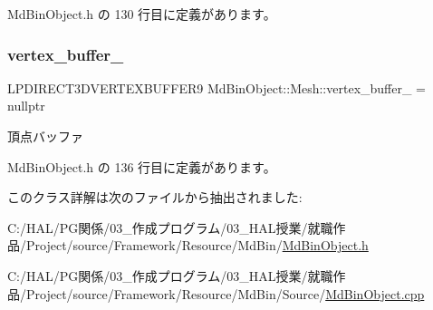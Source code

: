  Md\+Bin\+Object.\+h の 130 行目に定義があります。

\mbox{\label{class_md_bin_object_1_1_mesh_a184d71ac41aa259b9af29386f3349380}} 
\subsubsection{\texorpdfstring{vertex\+\_\+buffer\+\_\+}{vertex\_buffer\_}}
{\footnotesize\ttfamily L\+P\+D\+I\+R\+E\+C\+T3\+D\+V\+E\+R\+T\+E\+X\+B\+U\+F\+F\+E\+R9 Md\+Bin\+Object\+::\+Mesh\+::vertex\+\_\+buffer\+\_\+ = nullptr\hspace{0.3cm}{\ttfamily [private]}}



頂点バッファ 



 Md\+Bin\+Object.\+h の 136 行目に定義があります。



このクラス詳解は次のファイルから抽出されました\+:\begin{DoxyCompactItemize}
\item 
C\+:/\+H\+A\+L/\+P\+G関係/03\+\_\+作成プログラム/03\+\_\+\+H\+A\+L授業/就職作品/\+Project/source/\+Framework/\+Resource/\+Md\+Bin/\mbox{\hyperlink{_md_bin_object_8h}{Md\+Bin\+Object.\+h}}\item 
C\+:/\+H\+A\+L/\+P\+G関係/03\+\_\+作成プログラム/03\+\_\+\+H\+A\+L授業/就職作品/\+Project/source/\+Framework/\+Resource/\+Md\+Bin/\+Source/\mbox{\hyperlink{_md_bin_object_8cpp}{Md\+Bin\+Object.\+cpp}}\end{DoxyCompactItemize}
